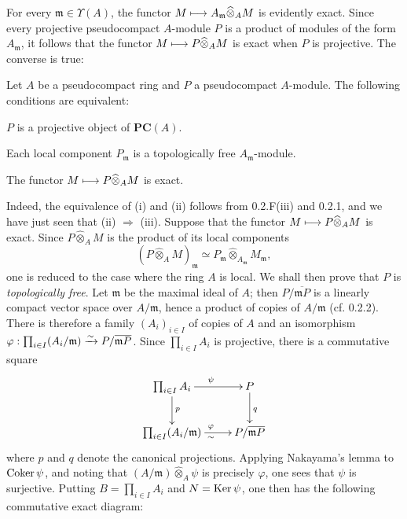 For every $\mathfrak m\in\Upsilon(A)$, the functor $M\longmapsto A_{\mathfrak m}\widehat\otimes_A M$ is evidently exact. Since every projective pseudocompact $A$-module $P$ is a product of modules of the form $A_{\mathfrak m}$, it follows that the functor $M\longmapsto P\widehat\otimes_A M$ is exact when $P$ is projective. The converse is true:
\begin{proposition}{}
Let $A$ be a pseudocompact ring and $P$ a pseudocompact $A$-module. The following conditions are equivalent:
\begin{enumeratei}
\item $P$ is a projective object of $\mathbf{PC}(A)$.
\item Each local component $P_{\mathfrak m}$ is a topologically free $A_{\mathfrak m}$-module.
\item The functor $M\longmapsto P\widehat\otimes_A M$ is exact.
\end{enumeratei}
\end{proposition}
Indeed, the equivalence of (i) and (ii) follows from 0.2.F(iii) and 0.2.1, and we have just seen that (ii) $\Rightarrow$ (iii). Suppose that the functor $M\longmapsto P\widehat\otimes_A M$ is exact. Since $P\widehat\otimes_A M$ is the product of its local components
\[
(P\widehat\otimes_A M)_{\mathfrak m}\simeq P_{\mathfrak m}\widehat\otimes_{A_{\mathfrak m}}M_{\mathfrak m},
\]
one is reduced to the case where the ring $A$ is local. We shall then prove that $P$ is \emph{topologically free}.
Let $\mathfrak m$ be the maximal ideal of $A$; then $P/\overline{\mathfrak mP}$ is a linearly compact vector space over $A/\mathfrak m$, hence a product of copies of $A/\mathfrak m$ (cf. 0.2.2). There is therefore a family $(A_i)_{i\in I}$ of copies of $A$ and an isomorphism $\varphi:\prod_{i\in I}(A_i/\mathfrak m)\xrightarrow{\sim} P/\overline{\mathfrak mP}$. Since $\prod_{i\in I}A_i$ is projective, there is a commutative square
\[
\xymatrix{
\prod_{i\in I}A_i\ar[r]^\psi\ar[d]^p&P\ar[d]^q\\
\prod_{i\in I}(A_i/\mathfrak m)\ar[r]^\varphi_\sim&P/\overline{\mathfrak mP}}
\]
where $p$ and $q$ denote the canonical projections. Applying Nakayama's lemma to $\operatorname{Coker}\psi$, and noting that $(A/\mathfrak m)\widehat\otimes_A\psi$ is precisely $\varphi$, one sees that $\psi$ is surjective.
Putting $B=\prod_{i\in I}A_i$ and $N=\operatorname{Ker}\psi$, one then has the following commutative exact diagram:
